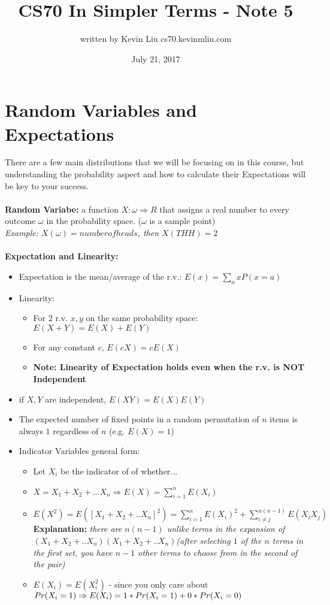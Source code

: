 \documentclass[a4paper]{article}
\title{CS70 In Simpler Terms - Note 5}
\author{written by Kevin Liu cs70.kevinmliu.com}
\date{July 21, 2017}
\begin{document}
\maketitle

\section{Random Variables and Expectations}
There are a few main distributions that we will be focusing on in this course, but understanding the probability aspect and how to calculate their Expectations will be key to your success.\\\\
\textbf{Random Variabe:} a function $X: \omega \Rightarrow R$ that assigns a real number to every outcome $\omega$ in the probability space. ($\omega$ is a sample point) \\
\indent \textit{Example: $X(\omega) = number of heads$, then $X(THH) = 2$}\\\\
\textbf{Expectation and Linearity:}
\begin{itemize}
    \item Expectation is the mean/average of the r.v.: $E(x)= \sum_a xP(x=a)$
    \item Linearity:
    \begin{itemize}
        \item For $2$ r.v. $x,y$ on the same probability space: $E(X+Y) = E(X) + E(Y)$
        \item For any constant $c$, $E(cX) = cE(X)$
        \item \textbf{Note: Linearity of Expectation holds even when the r.v. is NOT Independent}
    \end{itemize}
    \item if $X,Y$ are independent, $E(XY) = E(X)E(Y)$ 
    \item The expected number of fixed points in a random permutation of $n$ items is always $1$ regardless of $n$ (e.g. $E(X) = 1$)
    \item Indicator Variables general form:\\
    \begin{itemize}
        \item Let $X_i$ be the indicator of of whether...
        \item $X = X_1 + X_2 + ... X_n \Rightarrow E(X) = \sum_{i=1}^n E(X_i)$
        \item $E(X^2) = E([X_1 + X_2 + .. X_n]^2) = \sum_{i=1}^n E(X_i)^2 + \sum_{i\neq j}^{n(n-1)}E(X_i X_j)$ \textbf{Explanation:} \textit{there are $n(n-1)$ unlike terms in the expansion of $(X_1 + X_2 + .. X_n)(X_1 + X_2 + .. X_n)$(after selecting $1$ of the $n$ terms in the first set, you have $n-1$ other terms to choose from in the second of the pair)}
        \item $E(X_i) = E(X_i^2)$ - since you only care about $Pr(X_i=1) \Rightarrow \\E(X_i) = 1 * Pr(X_i = 1) + 0 * Pr(X_i = 0)$
        
    \end{itemize}

\end{itemize}
\end{document}
